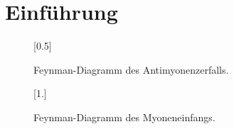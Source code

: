 \section{Einführung}
	
		\begin{figure}[hp]
			\centering
			\scalebox{0.5}[0.5]{
			
			}
			\label{fig:myonzerfall}
			\caption{Feynman-Diagramm des Antimyonenzerfalls.}
		\end{figure}
	
		\begin{figure}[hp]
			\centering
			\scalebox{1.}[1.]{
			
			}
			\label{fig:myoneinfang}
			\caption{Feynman-Diagramm des Myoneneinfangs.}
		\end{figure}